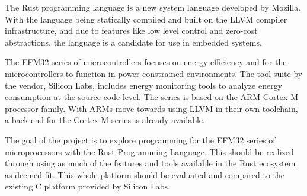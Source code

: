 
\label{chap:problem}

The Rust programming language is a new system language developed by Mozilla.
With the language being statically compiled and built on the LLVM compiler infrastructure, and due to features like low level control and zero-cost abstractions, the language is a candidate for use in embedded systems.

The EFM32 series of microcontrollers focuses on energy efficiency and for the microcontrollers to function in power constrained environments.
The tool suite by the vendor, Silicon Labs, includes energy monitoring tools to analyze energy consumption at the source code level.
The series is based on the ARM Cortex M processor family.
With ARMs move towards using LLVM in their own toolchain, a back-end for the Cortex M series is already available.

The goal of the project is to explore programming for the EFM32 series of microprocessors with the Rust Programming Language.
This should be realized through using as much of the features and tools available in the Rust ecosystem as deemed fit.
This whole platform should be evaluated and compared to the existing C platform provided by Silicon Labs.

